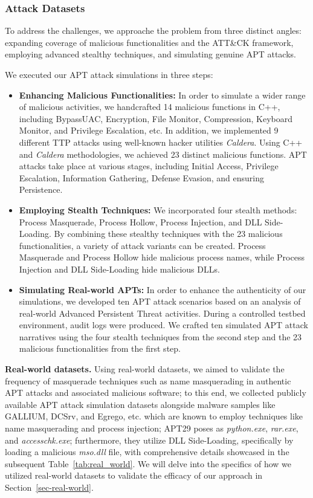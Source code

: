\subsubsection{Attack Datasets}

To address the challenges, we approache the problem from three distinct angles: expanding coverage of malicious functionalities and the ATT\&CK framework, employing advanced stealthy techniques, and simulating genuine APT attacks.

We executed our APT attack simulations in three steps:

\begin{itemize}
    \item  \textbf{Enhancing Malicious Functionalities:} In order to simulate a wider range of malicious activities, we handcrafted 14 malicious functions in C++, including BypassUAC, Encryption, File Monitor, Compression, Keyboard Monitor, and Privilege Escalation, etc. In addition, we implemented 9 different TTP attacks using well-known hacker utilities  \textit{Caldera}. Using C++ and \textit{Caldera} methodologies, we achieved 23 distinct malicious functions. APT attacks take place at various stages, including Initial Access, Privilege Escalation, Information Gathering, Defense Evasion, and ensuring Persistence.
    \item \textbf{Employing Stealth Techniques:} We incorporated four stealth methods: Process Masquerade, Process Hollow, Process Injection, and DLL Side-Loading. By combining these stealthy techniques with the 23 malicious functionalities, a variety of attack variants can be created. Process Masquerade and Process Hollow hide malicious process names, while Process Injection and DLL Side-Loading hide malicious DLLs.
    \item \textbf{Simulating Real-world APTs:} In order to enhance the authenticity of our simulations, we developed ten APT attack scenarios based on an analysis of real-world Advanced Persistent Threat activities. During a controlled testbed environment, audit logs were produced. We crafted ten simulated APT attack narratives using the four stealth techniques from the second step and the 23 malicious functionalities from the first step.
\end{itemize}

\noindent
{\bf Real-world datasets.} Using real-world datasets, we aimed to validate the frequency of masquerade techniques such as name masquerading in authentic APT attacks and associated malicious software; to this end, we collected publicly available APT attack simulation datasets alongside malware samples like GALLIUM\cite{cybereason2023}, DCSrv\cite{checkpoint2021}, and Egrego\cite{intrinsec}, etc. which are known to employ techniques like name masquerading and process injection;  APT29 poses as \textit{python.exe}, \textit{rar.exe}, and \textit{accesschk.exe}; furthermore, they utilize DLL Side-Loading, specifically by loading a malicious \textit{mso.dll} file, with comprehensive details showcased in the subsequent Table~\ref{tab:real_world}. We will delve into the specifics of how we utilized real-world datasets to validate the efficacy of our approach in Section~\ref{sec-real-world}.

